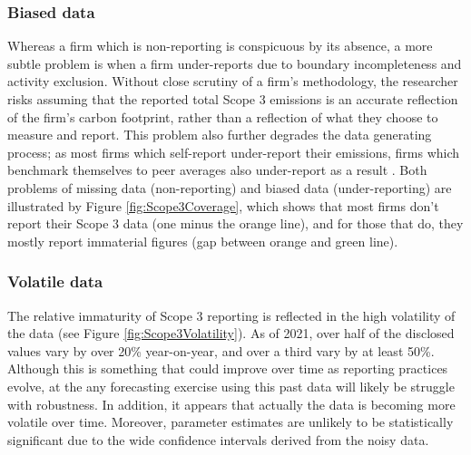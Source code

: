 \documentclass[12pt,twoside]{report}
\begin{document}
\subsubsection{Biased data}
Whereas a firm which is non-reporting is conspicuous by its absence, a more subtle problem is when a firm under-reports due to boundary incompleteness and activity exclusion. Without close scrutiny of a firm's methodology, the researcher risks assuming that the reported total Scope 3 emissions is an accurate reflection of the firm's carbon footprint, rather than a reflection of what they choose to measure and report. This problem also further degrades the data generating process; as most firms which self-report under-report their emissions, firms which benchmark themselves to peer averages also under-report as a result \cite{Hoepner2021}. Both problems of missing data (non-reporting) and biased data (under-reporting) are illustrated by Figure \ref{fig:Scope3Coverage}, which shows that most firms don't report their Scope 3 data (one minus the orange line), and for those that do, they mostly report immaterial figures (gap between orange and green line). 

\subsubsection{Volatile data}
The relative immaturity of Scope 3 reporting is reflected in the high volatility of the data (see Figure \ref{fig:Scope3Volatility}). As of 2021, over half of the disclosed values vary by over 20\% year-on-year, and over a third vary by at least 50\%. Although this is something that could improve over time as reporting practices evolve, at the  any forecasting exercise using this past data will likely be struggle with robustness. In addition, it appears that actually the data is becoming more volatile over time. Moreover, parameter estimates are unlikely to be statistically significant due to the wide confidence intervals derived from the noisy data. 
\end{document}
